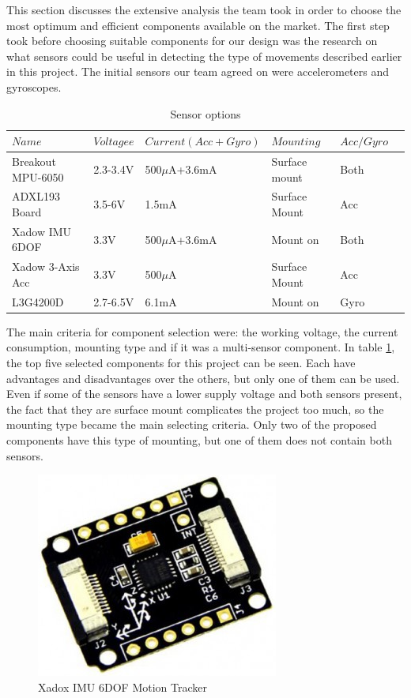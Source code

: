 This section discusses the extensive analysis the team took in order to choose the most optimum and efficient components available on the market. The first step took before choosing suitable components for our design was the research on what sensors could be useful in detecting the type of movements described earlier in this project. The initial sensors our team agreed on were accelerometers and gyroscopes.
\begin{table}[h]
	\centering
	\begin{tabular}{llllll}
		\hline
		$Name$ & $Voltagee$ & $Current(Acc+Gyro)$ & $Mounting$ & $Acc/Gyro$ \\
		\hline
		Breakout MPU-6050 & 2.3-3.4V & 500$\mu$A+3.6mA & Surface mount & Both\\
		\hline
		 ADXL193 Board & 3.5-6V & 1.5mA & Surface Mount & Acc \\
		\hline
		Xadow IMU 6DOF  & 3.3V &  500$\mu$A+3.6mA & Mount on & Both \\
		\hline
		Xadow 3-Axis Acc &  3.3V & 500$\mu$A & Surface Mount & Acc \\
		\hline
		 L3G4200D &  2.7-6.5V & 6.1mA & Mount on  & Gyro \\
		\hline
	\end{tabular}
	\caption{Sensor options}
	\label{table: componentsx}
\end{table}

The main criteria for component selection were: the working voltage, the current consumption, mounting type and if it was a multi-sensor component. In table \ref{table: componentsx}, the top five selected components for this project can be seen. Each have advantages and disadvantages over the others, but only one of them can be used. Even if some of the sensors have a lower supply voltage and both sensors present, the fact that they are surface mount complicates the project too much, so the mounting type became the main selecting criteria. Only two of the proposed components have this type of mounting, but one of them does not contain both sensors.

\begin{figure}
\centering
\includegraphics[scale=0.4]{figures/Xadow_IMU_6DOF.PNG}
\caption{Xadox IMU 6DOF Motion Tracker \label{fig:xadox}}
\end{figure}


